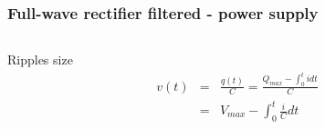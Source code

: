 \documentclass[beamer]{standalone}
\begin{document}
\begin{frame}
 \frametitle{Full-wave rectifier filtered - power supply}
  \begin{columns}[t]
    \begin{column}{.45\textwidth}
      Ripples size
      \begin{eqnarray*}
        v(t) & = & \frac{q(t)}{C} = \frac{Q_{max}- \int_0^t i dt}{C} \\
             & = & V_{max} - \int_0^t \frac{i}{C} dt\\

\end{eqnarray*}
\end{column}
\end{columns}
\end{frame}
\end{document}

